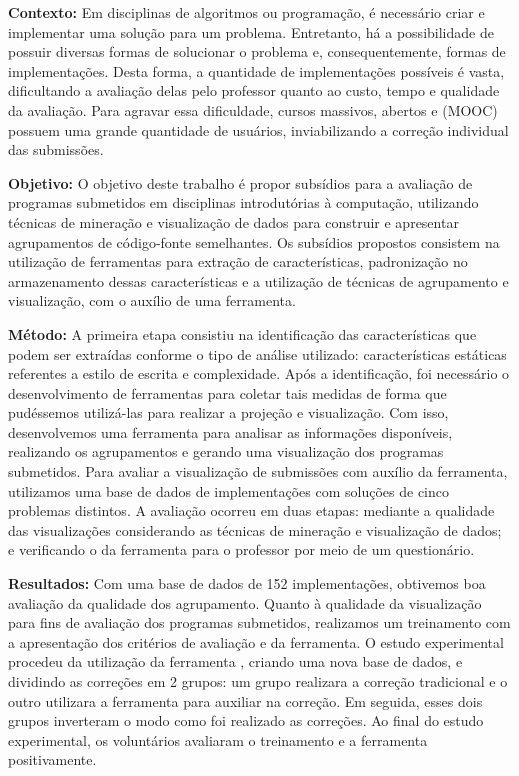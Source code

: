 \begin{resumo}
\textbf{Contexto:} Em disciplinas de algoritmos ou programação, é necessário criar
e implementar uma solução para um problema. Entretanto, há a possibilidade de possuir
diversas formas de solucionar o problema e, consequentemente, formas de implementações.
Desta forma, a quantidade de implementações possíveis é vasta, dificultando a avaliação
delas pelo professor quanto ao custo, tempo e qualidade da avaliação.
Para agravar essa dificuldade, cursos massivos, abertos e  (MOOC)
possuem uma grande quantidade de usuários, inviabilizando
a correção individual das submissões.

\textbf{Objetivo:} O objetivo deste trabalho é propor subsídios para a avaliação de
programas submetidos em disciplinas introdutórias à computação, utilizando técnicas
de mineração e visualização de dados para construir e apresentar agrupamentos de
código-fonte semelhantes. Os subsídios propostos consistem na utilização de ferramentas
para extração de características, padronização no armazenamento dessas características
e a utilização de técnicas de agrupamento e visualização, com o auxílio de uma ferramenta.

\textbf{Método:} A primeira etapa consistiu na identificação das características que
podem ser extraídas conforme o tipo de análise utilizado: características estáticas
referentes a estilo de escrita e complexidade. Após a identificação, foi necessário o desenvolvimento de ferramentas para coletar tais medidas de forma que pudéssemos
utilizá-las para realizar a projeção e visualização. Com isso, desenvolvemos uma
ferramenta para analisar as informações disponíveis, realizando os agrupamentos e
gerando uma visualização dos programas submetidos.
Para avaliar a visualização de submissões com auxílio da ferramenta, utilizamos
uma base de dados de implementações com soluções de cinco
problemas distintos. A avaliação ocorreu em duas etapas: mediante a qualidade
das visualizações considerando as técnicas de mineração e visualização de dados; e
verificando o  da ferramenta para o professor por meio de um
questionário.

\textbf{Resultados:} Com uma base de dados de 152 implementações, obtivemos boa
avaliação da qualidade dos agrupamento. Quanto à qualidade da visualização para
fins de avaliação dos programas submetidos, realizamos um treinamento com a
apresentação dos critérios de avaliação e da ferramenta. O estudo experimental
procedeu da utilização da
ferramenta , criando uma nova base de dados, e dividindo
as correções em 2 grupos: um grupo realizara a correção tradicional e o outro
utilizara a ferramenta para auxiliar na correção. Em seguida, esses dois grupos
inverteram o modo como foi realizado as correções. Ao final do estudo experimental,
os voluntários avaliaram o treinamento e a ferramenta positivamente.


\end{resumo}
